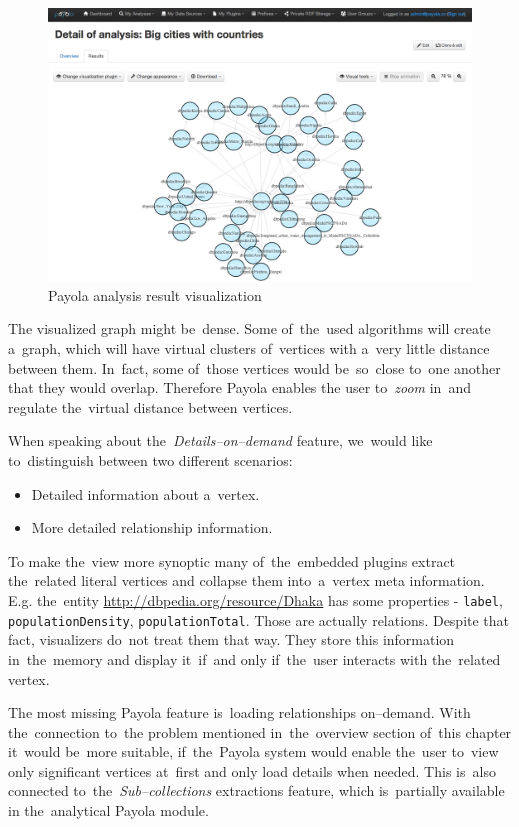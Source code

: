 \begin{figure}
	\centering
	\includegraphics[width=140mm]{img/payola.png}
	\caption{Payola analysis result visualization}
	\label{fig:palyola-vis}
\end{figure}


The visualized graph might be~dense. Some of~the~used algorithms will create a~graph, which
will have virtual clusters of~vertices with a~very little distance between them. In~fact, some of~those
vertices would be~so~close to~one another that they would overlap. Therefore Payola enables the
user to~\emph{zoom} in~and regulate the~virtual distance between vertices.

When speaking about the~\emph{Details--on--demand} feature, we~would like to~distinguish
between two different
scenarios:

\begin{itemize}
\item Detailed information about a~vertex.
\item More detailed relationship information.
\end{itemize}

To make the~view more synoptic many of~the~embedded plugins extract the~related literal
vertices and collapse them into~a~vertex meta information. E.g. the~entity
\url{http://dbpedia.org/resource/Dhaka} has some properties - \texttt{label},
\texttt{populationDensity}, \texttt{populationTotal}.
Those are actually relations. Despite that fact, visualizers do~not treat them
that way. They store this information in~the~memory and display it~if~and only if~the~user
interacts with the~related vertex.

The most missing Payola feature is~loading relationships on--demand. With the~connection to~the
problem
mentioned in~the~overview section of~this chapter it~would be~more suitable, if~the~Payola system
would enable the~user to~view only significant vertices at~first and only load details when needed.
This is~also connected to~the~\emph{Sub--collections} extractions feature, which is~partially available
in the~analytical Payola module.

